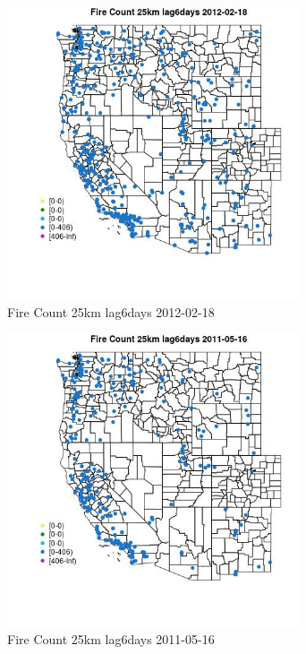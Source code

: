 \begin{figure} 
\centering  
\includegraphics[width=0.77\textwidth]{Code_Outputs/Report_ML_input_PM25_Step4_part_f_de_duplicated_aveswNAs_MapObsFire_Count_25km_lag6days2012-02-18.jpg} 
\caption{\label{fig:Report_ML_input_PM25_Step4_part_f_de_duplicated_aveswNAsMapObsFire_Count_25km_lag6days2012-02-18}Fire Count 25km lag6days 2012-02-18} 
\end{figure} 
 

\begin{figure} 
\centering  
\includegraphics[width=0.77\textwidth]{Code_Outputs/Report_ML_input_PM25_Step4_part_f_de_duplicated_aveswNAs_MapObsFire_Count_25km_lag6days2011-05-16.jpg} 
\caption{\label{fig:Report_ML_input_PM25_Step4_part_f_de_duplicated_aveswNAsMapObsFire_Count_25km_lag6days2011-05-16}Fire Count 25km lag6days 2011-05-16} 
\end{figure} 
 


